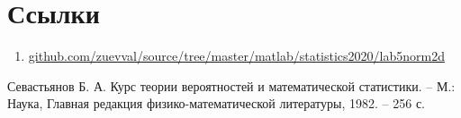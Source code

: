 \documentclass[a4paper,12pt]{article} %
\begin{document}
	
	\tableofcontents \newpage
	\listoffigures \listoftables \newpage
	
	
	\newpage
	\section{Ссылки}
	\begin{enumerate}
		\item \href{https://github.com/zuevval/source/tree/master/matlab/statistics2020/lab5norm2d}{github.com/zuevval/source/tree/master/matlab/statistics2020/lab5norm2d} \label{link:lab5}
	\end{enumerate}
	
	\begin{thebibliography}{99}
		 Севастьянов Б. А. Курс теории вероятностей и математической статистики. -- М.: Наука, Главная редакция физико-математической литературы, 1982. -- 256 с.
	\end{thebibliography}
\end{document}
